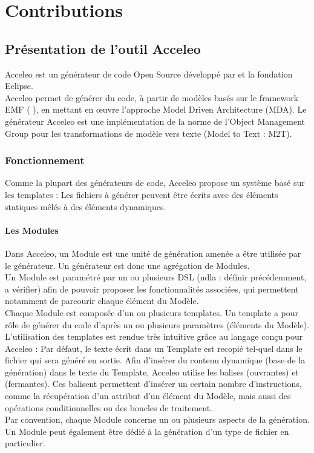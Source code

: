 \chapter{Contributions}\label{chap:tra}

\section{Présentation de l'outil Acceleo}

Acceleo est un générateur de code Open Source développé par \kwobeo{} et la fondation Eclipse.
\\
Acceleo permet de générer du code, à partir de modèles basés sur le framework EMF (\cf{} \cite{emf}), en mettant en œuvre l'approche Model Driven Architecture (MDA). Le générateur Acceleo est une implémentation de la norme de l'Object Management Group \cite{omg} pour les transformations de modèle vers texte (Model to Text : M2T).

\subsection{Fonctionnement}

Comme la plupart des générateurs de code, Acceleo propose un système basé sur les templates : Les fichiers à générer peuvent être écrits avec des éléments statiques mêlés à des éléments dynamiques.

\subsubsection{Les Modules}

Dans Acceleo, un Module est une unité de génération amenée a être utilisée par le générateur. Un générateur est donc une agrégation de Modules.
\\
Un Module est paramétré par un ou plusieurs DSL (ndla : définir précédemment, a vérifier) afin de pouvoir proposer les fonctionnalités associées, qui permettent notamment de parcourir chaque élément du Modèle.
\\
Chaque Module est composée d'un ou plusieurs templates. Un template a pour rôle de générer du code d'après un ou plusieurs paramètres (éléments du Modèle). L'utilisation des templates est rendue très intuitive grâce au langage conçu pour Acceleo : Par défaut, le texte écrit dans un Template est recopié tel-quel dans le fichier qui sera généré en sortie. Afin d'insérer du contenu dynamique (base de la génération) dans le texte du Template, Acceleo utilise les balises \guim{\textbf{[}} (ouvrantes) et \guim{\textbf{/]}} (fermantes). Ces balisent permettent d'insérer un certain nombre d'instructions, comme la récupération d'un attribut d'un élément du Modèle, mais aussi des opérations conditionnelles ou des boucles de traitement.
\\
Par convention, chaque Module concerne un ou plusieurs aspects de la génération. Un Module peut également être dédié à la génération d'un type de fichier en particulier.

